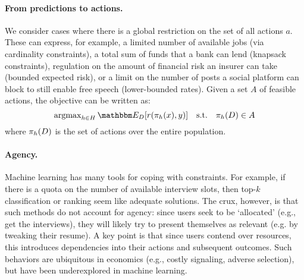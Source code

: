 

\paragraph{From predictions to actions.}
We consider cases where there is a global restriction on the set of all actions $a$. These can express, for example,
a limited number of available jobs (via cardinality constraints),
a total sum of funds that a bank can lend (knapsack constraints),
regulation on the amount of financial risk an insurer can take (bounded expected risk),
or a limit on the number of posts a social platform can block to still enable free speech (lower-bounded rates).
Given a set $A$ of feasible actions,
the objective can be written as:
\begin{equation}
\label{eq:order1_objective}
\argmax\nolimits_{h \in H} \expect{\dist}{\reward(\policy_h(x),y)}
\quad \text{s.t.} \quad
\policy_h(\dist) \in A
\end{equation}
where ${\pi}_h({D})$ is the set of actions over the entire population.  



\paragraph{Agency.}
Machine learning has many tools for coping with constraints.
For example, if there is a quota on the number of available interview slots,
then top-$k$ classification \citep[e.g.][]{lapin2015top,petersen2022differentiable} or ranking \citep[e.g.][]{cao2007learning}
seem like adequate solutions.
The crux, however, is that such methods do not account for agency:
since users seek to be `allocated' (e.g., get the interviews),
they will likely try to present themselves as relevant
(e.g. by tweaking their resume).
A key point is that since users contend over resources,
this introduces dependencies into their actions and subsequent outcomes.
Such behaviors are ubiquitous in economics
(e.g., costly signaling, adverse selection),
but have been underexplored in machine learning.
\squeeze

